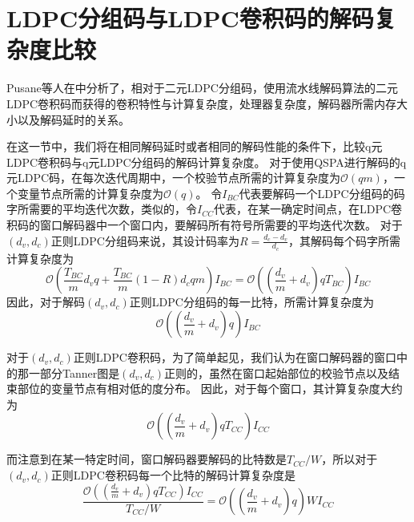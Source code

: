 \section{LDPC分组码与LDPC卷积码的解码复杂度比较}
Pusane等人在\parencite{5695133}中分析了，相对于二元LDPC分组码，使用流水线解码算法的二元LDPC卷积码而获得的卷积特性与计算复杂度，处理器复杂度，解码器所需内存大小以及解码延时的关系。

在这一节中，我们将在相同解码延时或者相同的解码性能的条件下，比较q元LDPC卷积码与q元LDPC分组码的解码计算复杂度。
对于使用QSPA进行解码的q元LDPC码，在每次迭代周期中，一个校验节点所需的计算复杂度为$\mathcal{O}(qm)$，一个变量节点所需的计算复杂度为$\mathcal{O}(q)$。
令$I_{BC}$代表要解码一个LDPC分组码的码字所需要的平均迭代次数，类似的，令$I_{CC}$代表，在某一确定时间点，在LDPC卷积码的窗口解码器中一个窗口内，要解码所有符号所需要的平均迭代次数。
对于$(d_v,d_c)$正则LDPC分组码来说，其设计码率为$R=\frac{d_c-d_v}{d_c}$，其解码每个码字所需计算复杂度为
\begin{equation}
\mathcal{O} \left(\frac{T_{BC}}{m}d_vq+\frac{T_{BC}}{m}\left(1-R\right)d_cqm\right)I_{BC}=\mathcal{O}\left(\left(\frac{d_v}{m}+d_v\right)qT_{BC}\right)I_{BC}
\end{equation}
因此，对于解码$(d_v,d_c)$正则LDPC分组码的每一比特，所需计算复杂度为
\begin{equation}
\mathcal{O}\left(\left(\frac{d_v}{m}+d_v\right)q\right)I_{BC}
\end{equation}

对于$(d_v,d_c)$正则LDPC卷积码，为了简单起见，我们认为在窗口解码器的窗口中的那一部分Tanner图是$(d_v,d_c)$正则的，虽然在窗口起始部位的校验节点以及结束部位的变量节点有相对低的度分布。
因此，对于每个窗口，其计算复杂度大约为
\begin{equation}
\mathcal{O}\left(\left(\frac{d_v}{m}+d_v\right)qT_{CC}\right)I_{CC}
\end{equation}

而注意到在某一特定时间，窗口解码器要解码的比特数是$T_{CC}/W$，所以对于$(d_v,d_c)$正则LDPC卷积码每一个比特的解码计算复杂度是
\begin{equation}
\frac{\mathcal{O}\left(\left(\frac{d_v}{m}+d_v\right)qT_{CC}\right)I_{CC}}{T_{CC}/W} = \mathcal{O}\left(\left(\frac{d_v}{m}+d_v\right)q\right)WI_{CC}
\end{equation}

